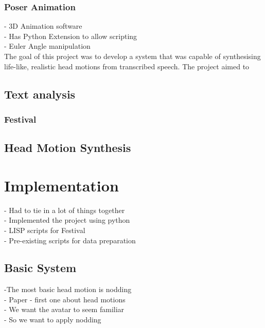 \documentclass[bsc,frontabs,twoside,singlespacing,parskip]{infthesis}
\begin{document}
\subsection{Poser Animation}


- 3D Animation software \\
- Has Python Extension to allow scripting \\
- Euler Angle manipulation \\


The goal of this project was to develop a system that was capable of synthesising life-like, realistic head motions from transcribed speech. The project aimed to 
\section{Text analysis}
\subsection{Festival}

\section{Head Motion Synthesis}

\chapter{Implementation}

- Had to tie in a lot of things together \\
- Implemented the project using python \\
- LISP scripts for Festival \\
- Pre-existing scripts for data preparation

\section{Basic System}
-The most basic head motion is nodding \\
- Paper - first one about head motions \\
- We want the avatar to seem familiar \\
- So we want to apply nodding \\
\end{document}
